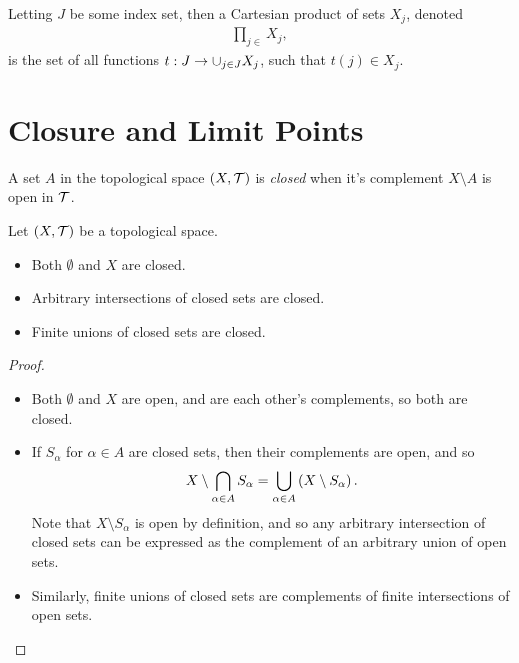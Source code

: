 \begin{defn}
    Letting $J$ be some index set, then a Cartesian product of sets $X_j$, denoted
    \begin{align*}
        \prod_{j \in }X_j,
    \end{align*}
    is the set of all functions $t: J \to \cup_{j \in J}X_j$, such that $t(j) \in X_j$.
\end{defn}

\section{Closure and Limit Points}

\begin{defn}
    A set $A$ in the topological space $(X, \mathcal{T})$ is \emph{closed} when it's complement $X \setminus A$ is open in $\mathcal{T}$.
\end{defn}

\begin{thm} Let $(X, \mathcal{T})$ be a topological space.
    \begin{itemize}
        \item Both $\emptyset$ and $X$ are closed.
        \item Arbitrary intersections of closed sets are closed.
        \item Finite unions of closed sets are closed.
    \end{itemize}
\end{thm}

\begin{proof}\proofbreak
    \begin{itemize}
        \item Both $\emptyset$ and $X$ are open, and are each other's complements, so both are closed.
        \item If $S_{\alpha}$ for $\alpha \in A$ are closed sets, then their complements are open, and so \begin{align*}
            X \setminus \bigcap_{\alpha \in A}S_{\alpha} = \bigcup_{\alpha \in A}\left(X \setminus S_{\alpha}\right).
        \end{align*}
        Note that $X \setminus S_{\alpha}$ is open by definition, and so any arbitrary intersection of closed sets can be expressed as the complement of an arbitrary union of open sets.
        \item Similarly, finite unions of closed sets are complements of finite intersections of open sets.
    \end{itemize}
\end{proof}

